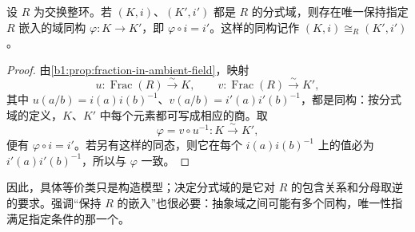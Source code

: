 \begin{corollary}\label{b1:cor:fraction-field-unique}
	设 \(R\) 为交换整环。若 \((K,i)\)、\((K',i')\) 都是 \(R\) 的分式域，则存在唯一保持指定 \(R\) 嵌入的域同构 \(\varphi:K\rightarrow K'\)，即 \(\varphi\circ i=i'\)。这样的同构记作 \((K,i)\cong_R(K',i')\)。
\end{corollary}
\begin{proof}
	由\cref{b1:prop:fraction-in-ambient-field}，映射
	\[
		u:\operatorname{Frac}(R)\xrightarrow{\sim}K, \qquad v:\operatorname{Frac}(R)\xrightarrow{\sim}K',
	\]
	其中 \(u(a/b)=i(a)i(b)^{-1}\)、\(v(a/b)=i'(a)i'(b)^{-1}\)，都是同构：按分式域的定义，\(K\)、\(K'\) 中每个元素都可写成相应的商。取
	\[
		\varphi=v\circ u^{-1}:K\xrightarrow{\sim}K',
	\]
	便有 \(\varphi\circ i=i'\)。若另有这样的同态，则它在每个 \(i(a)i(b)^{-1}\) 上的值必为 \(i'(a)i'(b)^{-1}\)，所以与 \(\varphi\) 一致。
\end{proof}
因此，具体等价类只是构造模型；决定分式域的是它对 \(R\) 的包含关系和分母取逆的要求。强调“保持 \(R\) 的嵌入”也很必要：抽象域之间可能有多个同构，唯一性指满足指定条件的那一个。
